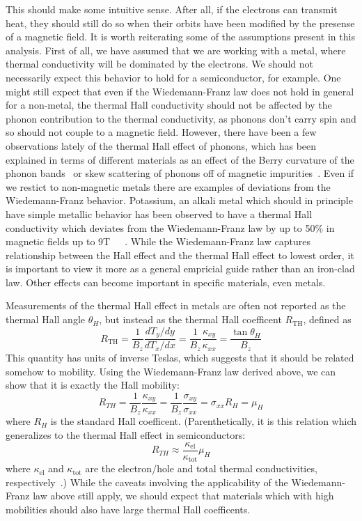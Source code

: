 \documentclass{thesis-umich}
\begin{document}
This should make some intuitive sense. After all, if the electrons can transmit
heat, they should still do so when their orbits have been modified by the
presense of a magnetic field. It is worth reiterating some of the assumptions
present in this analysis. First of all, we have assumed that we are working
with a metal, where thermal conductivity will be dominated by the electrons. We
should not necessarily expect this behavior to hold for a semiconductor, for
example. One might still expect that even if the Wiedemann-Franz law does not
hold in general for a non-metal, the thermal Hall conductivity should not be
affected by the phonon contribution to the thermal conductivity, as phonons
don't carry spin and so should not couple to a magnetic field. However, there
have been a few observations lately of the thermal Hall effect of phonons,
which has been explained in terms of different materials as an effect of the
Berry curvature of the phonon bands~\cite{Zhang2011} or skew scattering of
phonons off of magnetic impurities~\cite{Mori2014}. Even if we restict to
non-magnetic metals there are examples of deviations from the Wiedemann-Franz
behavior. Potassium, an alkali metal which should in principle have simple
metallic behavior has been observed to have a thermal Hall conductivity which deviates from the Wiedemann-Franz law by
up to 50\% in magnetic fields up to
9T~\cite{Tausch1977}~\cite{Fletcher1978}~\cite{Tausch1979}. While the
Wiedemann-Franz law captures relationship between the Hall effect and the
thermal Hall effect to lowest order, it is important to view it more as a
general empricial guide rather than an iron-clad law. Other effects can become
important in specific materials, even metals.

Measurements of the thermal Hall effect in metals are often not reported as the
thermal Hall angle $\theta_H$, but instead as the thermal Hall coefficent
$R_{\mathrm{TH}}$, defined as \[ R_{\mathrm{TH}} = \frac{1}{B_z}
\frac{dT_y/dy}{dT_x/dx} = \frac{1}{B_z} \frac{\kappa_{xy}}{\kappa_{xx}} =
\frac{\tan \theta_H}{B_z}\] This quantity has units of inverse Teslas, which
suggests that it should be related somehow to mobility. Using the
Wiedemann-Franz law derived above, we can show that it is exactly the Hall
mobility: \[ R_{TH} = \frac{1}{B_z}\frac{\kappa_{xy}}{\kappa_{xx}} =
\frac{1}{B_z}\frac{\sigma_{xy}}{\sigma_{xx}} = \sigma_{xx}R_H = \mu_H\] where
$R_H$ is the standard Hall coefficent. (Parenthetically, it is this relation
which generalizes to the thermal Hall effect in semiconductors:\[R_{TH} \approx
\frac{\kappa_{\mathrm{el}}}{\kappa_{\mathrm{tot}}} \mu_H\] where
$\kappa_{\mathrm{el}}$ and $\kappa_{\mathrm{tot}}$ are the electron/hole and
total thermal conductivities, respectively~\cite{Putley}.) While the caveats involving the applicability of the Wiedemann-Franz law above still apply, we should expect that materials which with high mobilities should also have large thermal Hall coefficents. 
\end{document}
